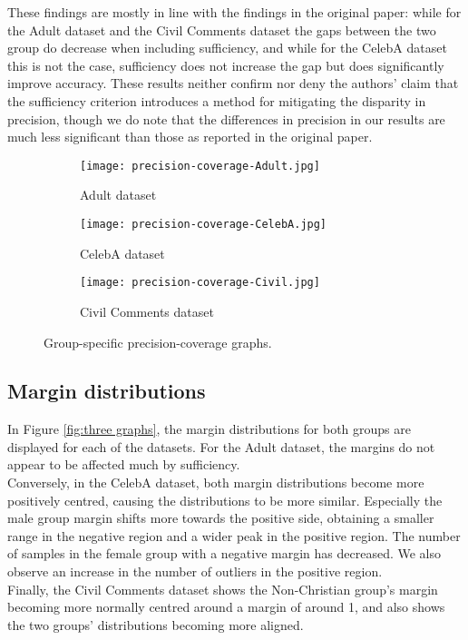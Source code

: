 These findings are mostly in line with the findings in the original paper: while for the Adult dataset and the Civil Comments dataset the gaps between the two group do decrease when including sufficiency, and while for the CelebA dataset this is not the case, sufficiency does not increase the gap but does significantly improve accuracy. These results neither confirm nor deny the authors' claim that the sufficiency criterion introduces a method for mitigating the disparity in precision, though we do note that the differences in precision in our results are much less significant than those as reported in the original paper. 

\begin{figure}[!h]
     \centering
     \begin{subfigure}[b]{0.3\textwidth}
         \centering
         \texttt{[image: precision-coverage-Adult.jpg]}
         \caption{Adult dataset}
         \label{fig:precAdult}
     \end{subfigure}
     \hfill
     \begin{subfigure}[b]{0.3\textwidth}
         \centering
         \texttt{[image: precision-coverage-CelebA.jpg]}
         \caption{CelebA dataset}
         \label{fig:precCelebA}
     \end{subfigure}
     \hfill
     \begin{subfigure}[b]{0.3\textwidth}
         \centering
         \texttt{[image: precision-coverage-Civil.jpg]}
         \caption{Civil Comments dataset}
         \label{fig:precCivil}
     \end{subfigure}
        \caption{Group-specific precision-coverage graphs.}
        \label{fig:prec}
\end{figure}

\subsection{Margin distributions}
In Figure \ref{fig:three graphs}, the margin distributions for both groups are displayed for each of the datasets. For the Adult dataset, the margins do not appear to be affected much by sufficiency. \\

Conversely, in the CelebA dataset, both margin distributions become more positively centred, causing the distributions to be more similar. Especially the male group margin shifts more towards the positive side, obtaining a smaller range in the negative region and a wider peak in the positive region. The number of samples in the female group with a negative margin has decreased. We also observe an increase in the number of outliers in the positive region.\\
Finally, the Civil Comments dataset shows the Non-Christian group's margin becoming more normally centred around a margin of around 1, and also shows the two groups' distributions becoming more aligned.

